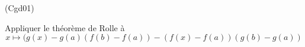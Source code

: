 \begin{tiny}(Cgd01)\end{tiny} Appliquer le théorème de Rolle à
\begin{displaymath}
  x \mapsto (g(x)-g(a)(f(b)-f(a))-(f(x)-f(a))(g(b)-g(a))
\end{displaymath}

